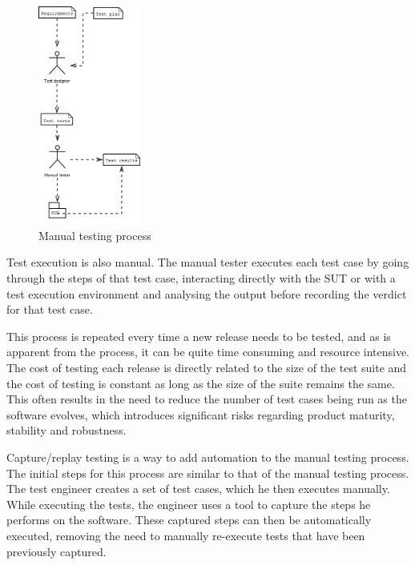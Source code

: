 \begin{figure}[ht]
	\begin{center}
		\includegraphics*[width=0.3\textwidth]{kuvat/Manual_process}
	\end{center}
	\caption{Manual testing process}
	\label{fig:manualprocess}
\end{figure}

Test execution is also manual. The manual tester executes each test case by going through the steps of that test case, interacting directly with the SUT or with a test execution environment and analysing the output before recording the verdict for that test case.

This process is repeated every time a new release needs to be tested, and as is apparent from the process, it can be quite time consuming and resource intensive. The cost of testing each release is directly related to the size of the test suite and the cost of testing is constant as long as the size of the suite remains the same. This often results in the need to reduce the number of test cases being run as the software evolves, which introduces significant risks regarding product maturity, stability and robustness.

Capture/replay testing is a way to add automation to the manual testing process. The initial steps for this process are similar to that of the manual testing process. The test engineer creates a set of test cases, which he then executes manually. While executing the tests, the engineer uses a tool to capture the steps he performs on the software. These captured steps can then be automatically executed, removing the need to manually re-execute tests that have been previously captured.

